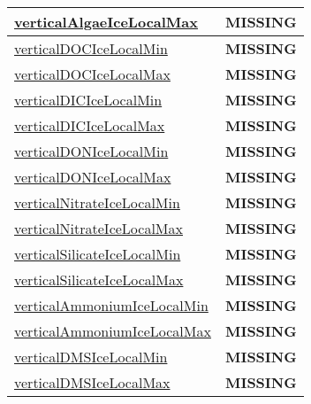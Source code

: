 {\begin{center}
\begin{longtable}{| p{2.0in} | p{4.0in} |}
    \hline
    \hyperref[subsec:var_sec_tracer_monotonicity_verticalAlgaeIceLocalMax]{verticalAlgaeIceLocalMax} & {\bf \color{red} MISSING} \\
    \hline
    \hyperref[subsec:var_sec_tracer_monotonicity_verticalDOCIceLocalMin]{verticalDOCIceLocalMin} & {\bf \color{red} MISSING} \\
    \hline
    \hyperref[subsec:var_sec_tracer_monotonicity_verticalDOCIceLocalMax]{verticalDOCIceLocalMax} & {\bf \color{red} MISSING} \\
    \hline
    \hyperref[subsec:var_sec_tracer_monotonicity_verticalDICIceLocalMin]{verticalDICIceLocalMin} & {\bf \color{red} MISSING} \\
    \hline
    \hyperref[subsec:var_sec_tracer_monotonicity_verticalDICIceLocalMax]{verticalDICIceLocalMax} & {\bf \color{red} MISSING} \\
    \hline
    \hyperref[subsec:var_sec_tracer_monotonicity_verticalDONIceLocalMin]{verticalDONIceLocalMin} & {\bf \color{red} MISSING} \\
    \hline
    \hyperref[subsec:var_sec_tracer_monotonicity_verticalDONIceLocalMax]{verticalDONIceLocalMax} & {\bf \color{red} MISSING} \\
    \hline
    \hyperref[subsec:var_sec_tracer_monotonicity_verticalNitrateIceLocalMin]{verticalNitrateIceLocalMin} & {\bf \color{red} MISSING} \\
    \hline
    \hyperref[subsec:var_sec_tracer_monotonicity_verticalNitrateIceLocalMax]{verticalNitrateIceLocalMax} & {\bf \color{red} MISSING} \\
    \hline
    \hyperref[subsec:var_sec_tracer_monotonicity_verticalSilicateIceLocalMin]{verticalSilicateIceLocalMin} & {\bf \color{red} MISSING} \\
    \hline
    \hyperref[subsec:var_sec_tracer_monotonicity_verticalSilicateIceLocalMax]{verticalSilicateIceLocalMax} & {\bf \color{red} MISSING} \\
    \hline
    \hyperref[subsec:var_sec_tracer_monotonicity_verticalAmmoniumIceLocalMin]{verticalAmmoniumIceLocalMin} & {\bf \color{red} MISSING} \\
    \hline
    \hyperref[subsec:var_sec_tracer_monotonicity_verticalAmmoniumIceLocalMax]{verticalAmmoniumIceLocalMax} & {\bf \color{red} MISSING} \\
    \hline
    \hyperref[subsec:var_sec_tracer_monotonicity_verticalDMSIceLocalMin]{verticalDMSIceLocalMin} & {\bf \color{red} MISSING} \\
    \hline
    \hyperref[subsec:var_sec_tracer_monotonicity_verticalDMSIceLocalMax]{verticalDMSIceLocalMax} & {\bf \color{red} MISSING} \\

\end{longtable}
\end{center}}
